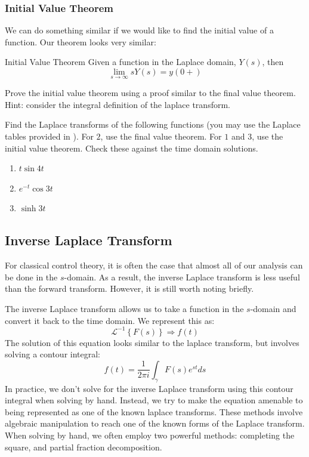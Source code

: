 \subsubsection{Initial Value Theorem}
We can do something similar if we would like to find the initial value of a function. Our theorem looks very similar:

\begin{theorem}{Initial Value Theorem}
    Given a function in the Laplace domain, $Y(s)$, then
    $$\lim_{s\rightarrow\infty} sY(s)=y(0+)$$
\end{theorem}
\begin{exercise}
    Prove the initial value theorem using a proof similar to the final value theorem. Hint: consider the integral definition of the \gls{laplace transform}.
\end{exercise}

\begin{exercise}
    Find the Laplace transforms of the following functions (you may use the Laplace tables provided in \cite{dawkins_differential_nodate}). For $2$, use the final value theorem. For $1$ and $3$, use the initial value theorem. Check these against the time domain solutions.
    \begin{enumerate}
        \item $t\sin 4t$
        \item $e^{-t}\cos3t$
        \item $\sinh{3t}$
    \end{enumerate}
\end{exercise}
\subsection{Inverse Laplace Transform}
For classical control theory, it is often the case that almost all of our analysis can be done in the $s$-domain. As a result, the inverse Laplace transform is less useful than the forward transform. However, it is still worth noting briefly.

The inverse Laplace transform allows us to take a function in the $s$-domain and convert it back to the time domain. We represent this as:
$$\mathscr{L}^{-1}\left\{F(s)\right\}\Rightarrow f(t)$$
The solution of this equation looks similar to the \gls{laplace transform}, but involves solving a contour integral:
$$f(t)=\frac{1}{2\pi i}\int_\gamma{F(s)e^{st}ds}$$
In practice, we don't solve for the inverse Laplace transform using this contour integral when solving by hand. Instead, we try to make the equation amenable to being represented as one of the known \glspl{laplace transform}. These methods involve algebraic manipulation to reach one of the known forms of the Laplace transform. When solving by hand, we often employ two powerful methods:  completing the square, and partial fraction decomposition.

